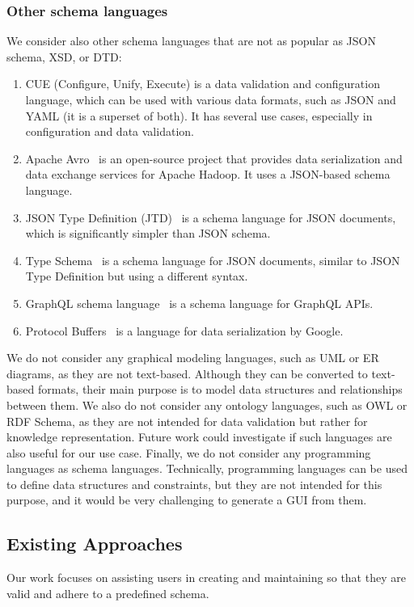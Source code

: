 \subsubsection{Other schema languages} %
We consider also other schema languages that are not as popular as JSON schema, XSD, or DTD\@:
\begin{enumerate}[label=(\alph*)]
    \item CUE (Configure, Unify, Execute)\cite{cuelang} is a data validation and configuration language, which can be used with various data formats, such as JSON and YAML (it is a superset of both).
    It has several use cases, especially in configuration and data validation.
    \item Apache Avro~\cite{Apache-Avro} is an open-source project that provides data serialization and data exchange services for Apache Hadoop.
    It uses a JSON-based schema language.
    \item JSON Type Definition (JTD)~\cite{rfc8927} is a schema language for JSON documents, which is significantly simpler than JSON schema.
    \item Type Schema~\cite{Kappestein_2023} is a schema language for JSON documents, similar to JSON Type Definition but using a different syntax.
    \item GraphQL schema language~\cite{graphQL} is a schema language for GraphQL APIs.
    \item Protocol Buffers~\cite{protobufProtocolBuffers} is a language for data serialization by Google.
\end{enumerate}

We do not consider any graphical modeling languages, such as UML or ER diagrams, as they are not text-based.
Although they can be converted to text-based formats, their main purpose is to model data structures and relationships between them.
We also do not consider any ontology languages, such as OWL or RDF Schema, as they are not intended for data validation but rather for knowledge representation.
Future work could investigate if such languages are also useful for our use case.
Finally, we do not consider any programming languages as schema languages.
Technically, programming languages can be used to define data structures and constraints, but they are not intended for this purpose, and it would be very challenging to generate a GUI from them.

\subsection{Existing Approaches}\label{subsec:existing-approaches}
Our work focuses on assisting users in creating and maintaining \cfgfiles{} so that they are valid and adhere to a predefined schema.

